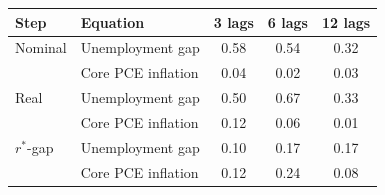 \begin{tabular}{llccc}
\toprule
Step & Equation & 3 lags & 6 lags & 12 lags \\
\midrule
Nominal & Unemployment gap & 0.58 & 0.54 & 0.32 \\
 & Core PCE inflation & 0.04 & 0.02 & 0.03 \\
Real & Unemployment gap & 0.50 & 0.67 & 0.33 \\
 & Core PCE inflation & 0.12 & 0.06 & 0.01 \\
$r^*$-gap & Unemployment gap & 0.10 & 0.17 & 0.17 \\
 & Core PCE inflation & 0.12 & 0.24 & 0.08 \\
\bottomrule
\end{tabular}
